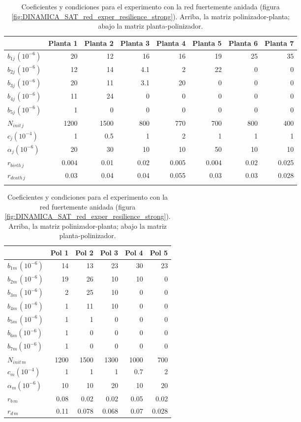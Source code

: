 \begin{table}
\centering
\normalsize
\caption{Coeficientes y condiciones para el experimento con la red fuertemente anidada (figura \ref{fig:DINAMICA_SAT_red_exper_resilience_strong}). Arriba, la matriz polinizador-planta; abajo la matriz planta-polinizador.}
\scriptsize
\begin{tabular}{lrrrrrrr}
\hline
 &Planta 1&Planta 2&Planta 3&Planta 4&Planta 5&Planta 6&Planta 7\\
\hline
$b_{1j\, }${\tiny $\left(10^{-6}\right)$}&20&12&16&16&19&25&35\\
$b_{2j\, }${\tiny $\left(10^{-6}\right)$}&12&14&4.1&2&22&0&0\\
$b_{3j\, }${\tiny $\left(10^{-6}\right)$}&20&11&3.1&20&0&0&0\\
$b_{4j\, }${\tiny $\left(10^{-6}\right)$}&11&24&0&0&0&0&0\\
$b_{5j\, }${\tiny $\left(10^{-6}\right)$}&1&0&0&0&0&0&0\\
$N_{init\,j}$&1200 & 1500 & 800 & 770 & 700 & 800 & 400\\
$c_{j}${\tiny $\left(10^{-4}\right)$} & 1 & 0.5 & 1 & 2 & 1 & 1 & 1\\
$\alpha_{j}${\tiny $\left(10^{-6}\right)$} & 20 & 30 & 10 & 10 & 50 & 10 &10\\
$r_{birth\, j}$ & 0.004 & 0.01 & 0.02 & 0.005 & 0.004 & 0.02 & 0.025\\
$r_{death\, j}$ & 0.03 & 0.04 & 0.04 & 0.055 & 0.03 & 0.03 & 0.028\\
\hline
\\
\end{tabular}
\centering
\begin{tabular}{lrrrrr}
\hline
 &Pol 1&Pol 2&Pol 3&Pol 4&Pol 5\\
\hline
$b_{1m\,}${\tiny $\left(10^{-6}\right)$}&14&13&23&30&23\\
$b_{2m\,}${\tiny $\left(10^{-6}\right)$}&19&26&10&10&0\\
$b_{3m\,}${\tiny $\left(10^{-6}\right)$}&2&25&10&0&0\\
$b_{4m\,}${\tiny $\left(10^{-6}\right)$}&1&11&10&0&0\\
$b_{5m\,}${\tiny $\left(10^{-6}\right)$}&1&1&0&0&0\\
$b_{6m}${\tiny $\left(10^{-6}\right)$}&1&0&0&0&0\\
$b_{7m}${\tiny $\left(10^{-6}\right)$}&1&0&0&0&0\\
$N_{init\,m}$ & 1200 & 1500 & 1300 & 1000 & 700 \\
$c_{m}${\tiny $\left(10^{-4}\right)$} & 1 & 1 & 1 & 0.7 & 2\\
$\alpha_{m}${\tiny $\left(10^{-6}\right)$} & 10 & 10 & 20 & 10 & 20\\
$r_{b\, m}$ & 0.08 & 0.02 & 0.02 & 0.05 & 0.02 \\
$r_{d\, m}$ & 0.11 & 0.078 & 0.068 & 0.07 & 0.028 \\
\hline
\end{tabular}
\label{tab:SAT_exper_resilience_strong}
\end{table}

